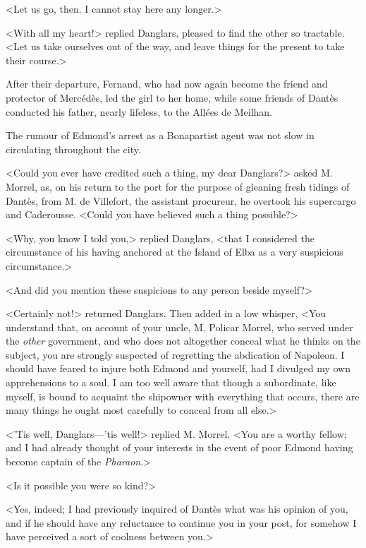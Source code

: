  <Let us go, then. I cannot stay here any longer.> 

 <With all my heart!> replied Danglars, pleased to find the other so tractable. <Let us take ourselves out of the way, and leave things for the present to take their course.> 

 After their departure, Fernand, who had now again become the friend and protector of Mercédès, led the girl to her home, while some friends of Dantès conducted his father, nearly lifeless, to the Allées de Meilhan. 

 The rumour of Edmond's arrest as a Bonapartist agent was not slow in circulating throughout the city. 

 <Could you ever have credited such a thing, my dear Danglars?> asked M. Morrel, as, on his return to the port for the purpose of gleaning fresh tidings of Dantès, from M. de Villefort, the assistant procureur, he overtook his supercargo and Caderousse. <Could you have believed such a thing possible?> 

 <Why, you know I told you,> replied Danglars, <that I considered the circumstance of his having anchored at the Island of Elba as a very suspicious circumstance.> 

 <And did you mention these suspicions to any person beside myself?>  
 
 <Certainly not!> returned Danglars. Then added in a low whisper, <You understand that, on account of your uncle, M. Policar Morrel, who served under the \textit{other} government, and who does not altogether conceal what he thinks on the subject, you are strongly suspected of regretting the abdication of Napoleon. I should have feared to injure both Edmond and yourself, had I divulged my own apprehensions to a soul. I am too well aware that though a subordinate, like myself, is bound to acquaint the shipowner with everything that occurs, there are many things he ought most carefully to conceal from all else.> 

 <'Tis well, Danglars—'tis well!> replied M. Morrel. <You are a worthy fellow; and I had already thought of your interests in the event of poor Edmond having become captain of the \textit{Pharaon}.> 

 <Is it possible you were so kind?> 

 <Yes, indeed; I had previously inquired of Dantès what was his opinion of you, and if he should have any reluctance to continue you in your post, for somehow I have perceived a sort of coolness between you.> 

